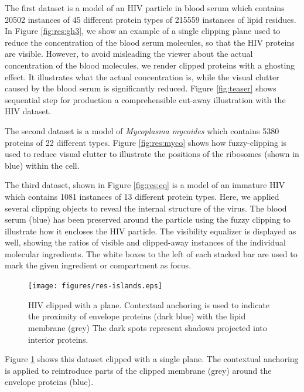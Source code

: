 The first dataset is a model of an HIV particle in blood serum which contains 20502 instances of 45 different protein types of 215559 instances of lipid residues.
In Figure \ref{fig:res:gh3}, we show an example of a single clipping plane used to reduce the concentration of the blood serum molecules, so that the HIV proteins are visible. 
However, to avoid misleading the viewer about the actual concentration of the blood molecules, we render clipped proteins with a ghosting effect. 
It illustrates what the actual concentration is, while the visual clutter caused by the blood serum is significantly reduced.
Figure \ref{fig:teaser} shows sequential step for production a comprehensible cut-away illustration with the HIV dataset.

The second dataset is a model of \emph{Mycoplasma mycoides} which contains 5380 proteins of 22 different types. 
Figure \ref{fig:res:myco} shows how fuzzy-clipping is used to reduce visual clutter to illustrate the positions of the ribosomes (shown in blue) within the cell.

The third dataset, shown in Figure \ref{fig:res:eq} is a model of an immature HIV which contains 1081 instances of 13 different protein types. 
Here, we applied several clipping objects to reveal the internal structure of the virus. 
The blood serum (blue) has been preserved around the particle using the fuzzy clipping to illustrate how it encloses the HIV particle. 
The visibility equalizer is displayed as well, showing the ratios of visible and clipped-away instances of the individual molecular ingredients. 
The white boxes to the left of each stacked bar are used to mark the given ingredient or compartment as focus.

\begin{figure}[b]
\vspace{-4mm}
\centering
\texttt{[image: figures/res-islands.eps]}
\caption{\label{fig:res:islands}
HIV clipped with a plane. 
Contextual anchoring is used to indicate the proximity of envelope proteins (dark blue) with the lipid membrane (grey)
The dark spots represent shadows projected into interior proteins.}
\end{figure}

Figure \ref{fig:res:islands} shows this dataset clipped with a single plane. 
The contextual anchoring is applied to reintroduce parts of the clipped membrane (grey) around the envelope proteins (blue).


